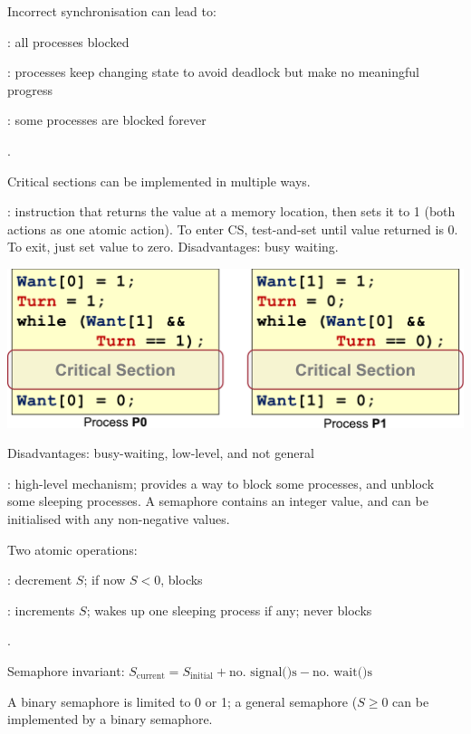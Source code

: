 \documentclass[fontsize=9pt]{slnotes}
\begin{document}
Incorrect synchronisation can lead to: \begin{slinenumor}
\item {}: all processes blocked
\item {}: processes keep changing state to avoid deadlock but make no meaningful progress
\item {}: some processes are blocked forever
\end{slinenumor}.

Critical sections can be implemented in multiple ways.

: instruction that returns the value at a memory location, then sets it to 1 (both actions as one atomic action). To enter CS, test-and-set until value returned is 0. To exit, just set value to zero. Disadvantages: busy waiting.


\includegraphics[width=\columnwidth]{petersons.pdf}

Disadvantages: busy-waiting, low-level, and not general

: high-level mechanism; provides a way to block some processes, and unblock some sleeping processes. A semaphore contains an integer value, and can be initialised with any non-negative values.

Two atomic operations: \begin{slinenum}
\item {}: decrement \(S\); if now \(S < 0\), blocks
\item {}: increments \(S\); wakes up one sleeping process if any; never blocks
\end{slinenum}.

Semaphore invariant: \(S_{\text{current}} = S_{\text{initial}} + \text{no. signal()s} - \text{no. wait()s}\)

A binary semaphore is limited to 0 or 1; a general semaphore (\(S \ge 0\) can be implemented by a binary semaphore.
\end{document}
